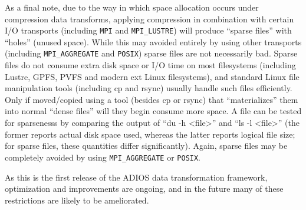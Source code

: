 As a final note, due to the way in which space allocation occurs under compression data transforms,
applying compression in combination with certain I/O transports (including
\verb+MPI+ and \verb+MPI_LUSTRE+) will produce ``sparse files'' with ``holes'' (unused space).
While this may avoided entirely by using other transports (including \verb+MPI_AGGREGATE+ and
\verb+POSIX+) sparse files are not necessarily bad. Sparse files do not consume extra disk space or
I/O time on most filesystems (including Lustre, GPFS, PVFS and modern ext Linux filesystems),
and standard Linux file manipulation tools (including cp and rsync) usually handle such files efficiently.
Only if moved/copied using a tool (besides cp or rsync) that ``materializes'' them into normal ``dense files''
will they begin consume more space. A file can be tested for sparsenesss by comparing the output of ``du -h <file>'' and
``ls -l <file>'' (the former reports actual disk space used, whereas the latter reports logical file size;
for sparse files, these quantities differ significantly).
Again, sparse files may be completely avoided by using \verb+MPI_AGGREGATE+ or \verb+POSIX+.

As this is the first release of the ADIOS data transformation framework, optimization and improvements are ongoing, and
in the future many of these restrictions are likely to be ameliorated.
